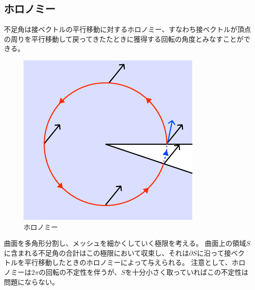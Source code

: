 \documentclass[12pt]{ltjsarticle}
\begin{document}
\subsection*{ホロノミー}
不足角は接ベクトルの平行移動に対するホロノミー、すなわち接ベクトルが頂点の周りを平行移動して戻ってきたたときに獲得する回転の角度とみなすことができる。
\begin{figure}[H]
    \centering
    \includegraphics[width=0.4\hsize]{Holonomy}
    \caption{ホロノミー}
\end{figure}
曲面を多角形分割し、メッシュを細かくしていく極限を考える。
曲面上の領域$S$に含まれる不足角の合計はこの極限において収束し、それは$∂S$に沿って接ベクトルを平行移動したときのホロノミーによって与えられる。
注意として、ホロノミーは$2𝜋$の回転の不定性を伴うが、$S$を十分小さく取っていればこの不定性は問題にならない。
\end{document}

